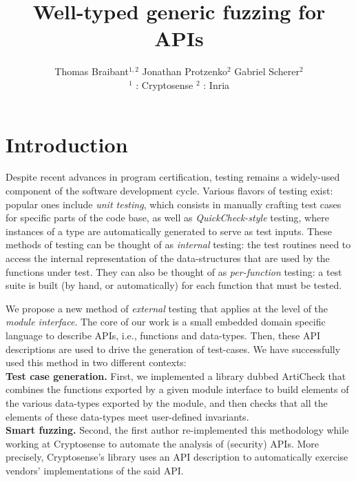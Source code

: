 \documentclass[twocolumn,9pt]{article}
\newcommand{\acheck}{ArtiCheck\xspace}
\begin{document}
\date{}

\title{\vspace{-2cm}Well-typed generic fuzzing for APIs}
\author{Thomas Braibant$^{1,2}$
  \quad Jonathan Protzenko$^{2}$
  \quad Gabriel Scherer$^{2}$ \\
  ${}^1$ : Cryptosense \quad ${}^2$ : Inria
}

\maketitle


\section{Introduction}
Despite recent advances in program certification, testing remains a
widely-used component of the software development cycle. Various
flavors of testing exist: popular ones include \emph{unit testing},
which consists in manually crafting test cases for specific parts of
the code base, as well as \emph{QuickCheck-style} testing, where
instances of a type are automatically generated to serve as test
inputs.
%
These methods of testing can be thought of as \emph{internal} testing:
the test routines need to access the internal representation of the
data-structures that are used by the functions under test. They can
also be thought of as \emph{per-function} testing: a test suite is
built (by hand, or automatically) for each function that must be
tested.

We propose a new method of \emph{external} testing that applies at the
level of the \emph{module interface}. The core of our work is a small
embedded domain specific language to describe APIs, i.e., functions
and data-types. Then, these API descriptions are used to drive the
generation of test-cases.
%
We have successfully used this method in two different contexts:
%
\\
\textbf{Test case generation.} First, we implemented a library dubbed
\acheck that combines the functions exported by a given module
interface to build elements of the various data-types exported by the
module, and then checks that all the elements of these data-types meet
user-defined invariants.
\\
\textbf{Smart fuzzing.} Second, the first author re-implemented this
methodology while working at Cryptosense to automate the analysis of
(security) APIs. More precisely, Cryptosense's library uses an API
description to automatically exercise vendors' implementations of the
said API.
\end{document}
